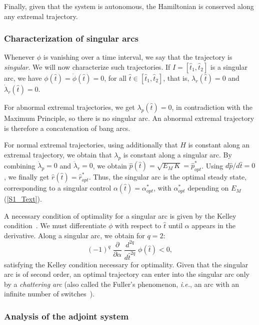 Finally, given that the system is autonomous, the Hamiltonian is conserved along any extremal trajectory.

\subsubsection{Characterization of singular arcs}

Whenever $\phi$ is vanishing over a time interval, we say that the trajectory is \textit{singular}.
We will now characterize such trajectories.
If $I=[\hat{t}_1,\hat{t}_2]$ is a singular arc, we have $\phi(\hat{t})=\dot{\phi}(\hat{t})=0$, for all $\hat{t}\in[\hat{t}_1,\hat{t}_2]$, that is, $\lambda_r(\hat{t})=0$ and $\dot\lambda_r(\hat{t})=0$. 

For abnormal extremal trajectories, we get $\lambda_p(\hat{t})=0$, in contradiction with the Maximum Principle, so there is no singular arc. An abnormal extremal trajectory is therefore a concatenation of bang arcs.

For normal extremal trajectories, using additionally that $H$ is constant along an extremal trajectory, we obtain that $\lambda_p$ is constant along a singular arc. By combining $\dot \lambda_p=0$ and $\dot \lambda_r=0$, we obtain $\hat{p}(\hat{t})=\sqrt{E_M\, K}=\hat{p}_{opt}^*$. Using $d\hat{p}/d\hat{t}=0$, we finally get $\hat{r}(\hat{t})=\hat{r}_{opt}^*$.
Thus, the singular arc is the optimal steady state, corresponding to a singular control $\alpha(\hat{t})=\alpha_{opt}^*$, with $\alpha_{opt}^*$ depending on $E_M$ (\ref{S1_Text}).

A necessary condition of optimality for a singular arc is given by the Kelley condition~\cite{borisov_fullers_2000}.
We must differentiate $\phi$ with respect to $\hat{t}$ until $\alpha$ appears in the derivative. Along a singular arc, we obtain for $q=2$:
\[
(-1)^q \; \frac{\partial}{\partial\alpha} \; \frac{d^{2q}}{d\hat{t}^{2q}} \; \phi(\hat{t})<0,
\]
satisfying the Kelley condition necessary for optimality. Given that the singular arc is of second order, an optimal trajectory can enter into the singular arc only by a \textit{chattering arc} (also called the Fuller's phenomenon, \textit{i.e.}, an arc with an infinite number of switches~\cite{borisov_fullers_2000,marchal_chattering_2013}).

\subsubsection{Analysis of the adjoint system}

